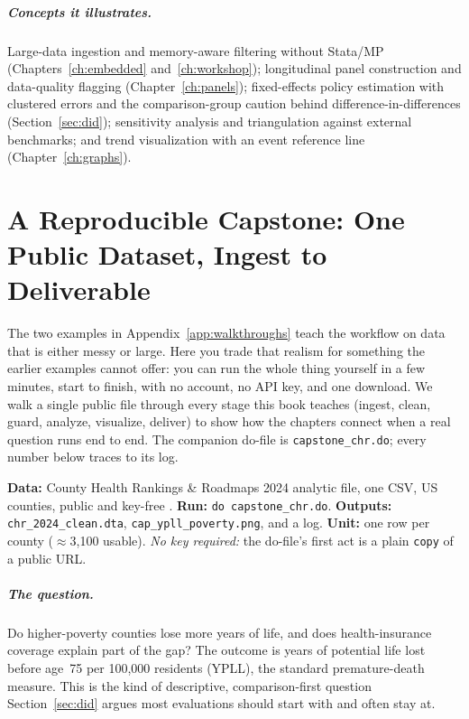 \documentclass[
    a4paper,
    fontsize=10pt,
    twoside=true,
    numbers=noenddot,
]{kaobook}
\begin{document}
\paragraph{Concepts it illustrates.} Large-data ingestion and memory-aware filtering without Stata/MP (Chapters~\ref{ch:embedded} and~\ref{ch:workshop}); longitudinal panel construction and data-quality flagging (Chapter~\ref{ch:panels}); fixed-effects policy estimation with clustered errors and the comparison-group caution behind difference-in-differences (Section~\ref{sec:did}); sensitivity analysis and triangulation against external benchmarks; and trend visualization with an event reference line (Chapter~\ref{ch:graphs}).

\chapter{A Reproducible Capstone: One Public Dataset, Ingest to Deliverable}\label{app:capstone}

The two examples in Appendix~\ref{app:walkthroughs} teach the workflow on data that is either messy or large. Here you trade that realism for something the earlier examples cannot offer: you can run the whole thing yourself in a few minutes, start to finish, with no account, no API key, and one download. We walk a single public file through every stage this book teaches (ingest, clean, guard, analyze, visualize, deliver) to show how the chapters connect when a real question runs end to end. The companion do-file is \texttt{capstone\_chr.do}; every number below traces to its log.

\begin{kaobox}[frametitle={Get the files: \texttt{capstone\_chr.do}}]
\textbf{Data:} County Health Rankings \& Roadmaps 2024 analytic file, one CSV, US counties, public and key-free \parencite{chr2024}. \textbf{Run:} \texttt{do capstone\_chr.do}. \textbf{Outputs:} \texttt{chr\_2024\_clean.dta}, \texttt{cap\_ypll\_poverty.png}, and a log. \textbf{Unit:} one row per county ($\approx$3,100 usable). \emph{No key required:} the do-file's first act is a plain \texttt{copy} of a public URL.
\end{kaobox}

\paragraph{The question.} Do higher-poverty counties lose more years of life, and does health-insurance coverage explain part of the gap? The outcome is years of potential life lost before age~75 per 100,000 residents (YPLL), the standard premature-death measure. This is the kind of descriptive, comparison-first question Section~\ref{sec:did} argues most evaluations should start with and often stay at.
\end{document}
